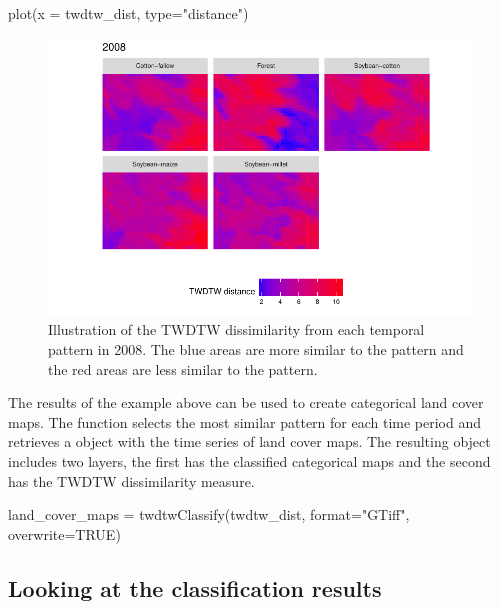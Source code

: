 \documentclass[article,shortnames]{jss}
\begin{document}
\begin{CodeChunk}
\begin{CodeInput}
plot(x = twdtw_dist, type="distance")
\end{CodeInput}
\begin{figure}[!ht]

{\centering \includegraphics{applying_twdtw_files/figure-latex/plot-dissmilarity2008-1} 

}

\caption[Illustration of the TWDTW dissimilarity from each temporal pattern in 2008]{Illustration of the TWDTW dissimilarity from each temporal pattern in 2008. The blue areas are more similar to the pattern and the red areas are less similar to the pattern.}\label{fig:plot-dissmilarity2008}
\end{figure}
\end{CodeChunk}

The results of the example above can be used to create categorical land
cover maps. The function  selects the most similar
pattern for each time period and retrieves a  object
with the time series of land cover maps. The resulting object includes
two layers, the first has the classified categorical maps and the second
has the TWDTW dissimilarity measure.

\begin{CodeChunk}
\begin{CodeInput}
land_cover_maps = twdtwClassify(twdtw_dist, format="GTiff", overwrite=TRUE)
\end{CodeInput}
\end{CodeChunk}

\subsection{Looking at the classification
results}\label{looking-at-the-classification-results}
\end{document}

